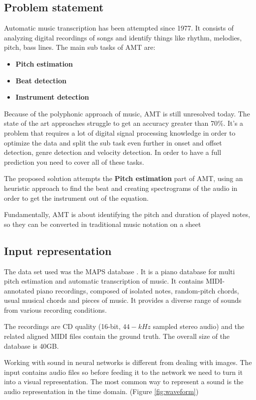 \subsection{Problem statement}
Automatic music transcription has been attempted since 1977\cite{transcription}. It consists of analyzing digital recordings of songs and identify things like rhythm, melodies, pitch, bass lines. The main sub tasks of AMT are:

\begin{itemize}
	\item \textbf{Pitch estimation}
	\item \textbf{Beat detection}
	\item \textbf{Instrument detection}
\end{itemize}

Because of the polyphonic approach of music, AMT is still unresolved today. The state of the art approaches struggle to get an accuracy greater than 70\%. It's a problem that requires a lot of digital signal processing knowledge in order to optimize the data and split the sub task even further in onset and offset detection, genre detection and velocity detection. In order to have a full prediction you need to cover all of these tasks.
	
The proposed solution attempts the \textbf{Pitch estimation} part of AMT, using an heuristic approach to find the beat and creating spectrograms of the audio in order to get the instrument out of the equation.
	

Fundamentally, AMT is about identifying the pitch and duration of played notes, so they can be converted in traditional music notation on a sheet

\subsection{Input representation}
The data set used was the MAPS database \cite{maps}. It is a piano database for multi pitch estimation and automatic transcription of music. It contains MIDI-annotated piano recordings, composed of isolated notes, random-pitch chords, usual musical chords and pieces of music. It provides a diverse range of sounds from various recording conditions.
\par
The recordings are CD quality (16-bit, $44-kHz$ sampled stereo audio) and the related aligned MIDI files contain the ground truth. The overall size of the database is 40GB. 
\par
Working with sound in neural networks is different from dealing with images. The input contains audio files so before feeding it to the network we need to turn it into a visual representation. The most common way to represent a sound is the audio representation in the time domain. (Figure \ref{fig:waveform})

